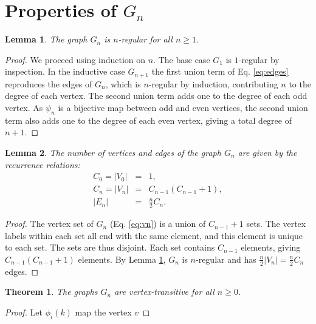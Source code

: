 \documentclass{article}
\newcommand{\beq}{\begin{eqnarray}}
\newcommand{\eeq}{\end{eqnarray}}
\newtheorem{lemma}{Lemma}
\newtheorem{theorem}{Theorem}
\begin{document}
\section{Properties of $G_n$}

\begin{lemma}
\label{lem:regular}
The graph $G_n$ is $n$-regular for all $n \geq 1$.
\end{lemma}
\begin{proof}
We proceed using induction on $n$.
The base case $G_1$ is $1$-regular by inspection.
In the inductive case $G_{n+1}$
the first union term of Eq. \ref{eq:edges}
reproduces the edges of $G_n$,
which is $n$-regular by induction,
contributing $n$ to the degree of each vertex.
The second union term adds one to the degree of each odd vertex.
As $\psi_n$ is a bijective map between odd and even vertices,
the second union term also adds one to the degree of each even vertex,
giving a total degree of $n + 1$.
\end{proof}

\begin{lemma}
The number of vertices and edges of the graph $G_n$ are given by the recurrence
relations:
\beq
C_0 = |V_0| &=& 1, \\
\label{eq:cnrec}C_{n} = |V_{n}| &=& C_{n-1} (C_{n-1} + 1), \\
|E_n| &=& \frac{n}{2} C_n.
\eeq
\end{lemma}
\begin{proof}
The vertex set of $G_n$ (Eq. \ref{eq:vn}) is a union of
$C_{n-1} + 1$ sets.
The vertex labels within each set all end with the same element,
and this element is unique to each set.
The sets are thus disjoint.
Each set contains $C_{n-1}$ elements, giving $C_{n-1}(C_{n-1} + 1)$
elements.
By Lemma \ref{lem:regular}, $G_n$ is $n$-regular and has
$\frac{n}{2}|V_n| = \frac{n}{2}C_n$ edges.
\end{proof}
\begin{theorem}
The graphs $G_n$ are vertex-transitive for all $n \geq 0$.
\end{theorem}
\begin{proof}
Let $\phi_i(k)$ map the vertex $v$ 
\end{proof}



\end{document}
